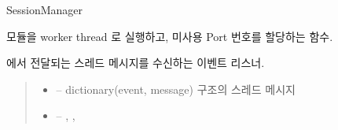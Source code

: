 \documentclass[a4paper,10pt,english]{sphinxmanual}
\begin{document}
\begin{fulllineitems}
\label{\detokenize{_SessionManager:SessionManager}}
\pysigstartsignatures
{}
\pysigstopsignatures
\sphinxAtStartPar
SessionManager

\begin{fulllineitems}
\label{\detokenize{_SessionManager:SessionManager._createSession}}
\pysigstartsignatures
{}
\pysigstopsignatures
\sphinxAtStartPar
{\hyperref[\detokenize{_Session:session}]{}} 모듈을 worker thread 로 실행하고, 미사용 Port 번호를 할당하는 함수.

\end{fulllineitems}


\begin{fulllineitems}
\label{\detokenize{_SessionManager:SessionManager._dhDaemonListener}}
\pysigstartsignatures
{}
\pysigstopsignatures
\sphinxAtStartPar
{\hyperref[\detokenize{_DHDaemon:dhdaemon}]{}} 에서 전달되는 스레드 메시지를 수신하는 이벤트 리스너.
\begin{quote}\begin{description}
\begin{itemize}
\item {} 
\sphinxAtStartPar
{} – dictionary(event, message) 구조의 스레드 메시지

\item {} 
\sphinxAtStartPar
{} – , , 


\end{itemize}
\end{description}
\end{quote}
\end{fulllineitems}
\end{fulllineitems}
\end{document}
